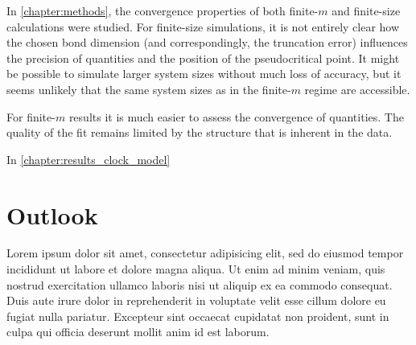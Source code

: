In \autoref{chapter:methods}, the convergence properties of both finite-$m$ and finite-size calculations were studied.
For finite-size simulations, it is not entirely clear how the chosen bond dimension (and correspondingly,
the truncation error) influences the precision of quantities and the position of the pseudocritical point.
It might be possible to simulate larger system sizes without much loss of accuracy,
but it seems unlikely that the same system sizes as in the finite-$m$ regime are accessible.

For finite-$m$ results it is much easier to assess the convergence of quantities.
The quality of the fit remains limited by the structure that is inherent in the data.

In \autoref{chapter:results_clock_model}







\section{Outlook}

Lorem ipsum dolor sit amet, consectetur adipisicing elit, sed do eiusmod tempor incididunt ut labore et dolore magna
aliqua.
Ut enim ad minim veniam, quis nostrud exercitation ullamco laboris nisi ut aliquip ex ea commodo consequat.
Duis aute irure dolor in reprehenderit in voluptate velit esse cillum dolore eu fugiat nulla pariatur.
Excepteur sint occaecat cupidatat non proident, sunt in culpa qui officia deserunt mollit anim id est laborum.
